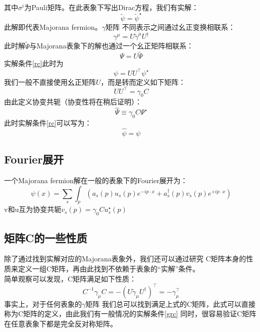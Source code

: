 \documentclass[12pt, a4paper, oneside]{ctexbook}
\def\gm{$ \gamma $矩阵 }
\begin{document}
	其中$ \sigma^i $为Pauli矩阵。在此表象下写出Dirac方程，我们有实解：
	\begin{equation}
		\widetilde{\psi}=\tilde{\psi}^{\star}\label{rc}
	\end{equation} 
	此解即代表Majorana fermion。\gm 不同表示之间通过幺正变换相联系：
	\begin{equation}
		\gamma^\mu=U \tilde{\gamma}^\mu U^{\dagger}
	\end{equation}
	此时解$ \tilde{\Psi} $与Majorana表象下的解也通过一个幺正矩阵相联系：
	\begin{equation}
		\Psi=U \tilde{\Psi}
	\end{equation} 
	实解条件\eqref{rc}此时为
	\begin{equation}
		\psi=U U^{\top} \psi^{\star}
	\end{equation}
	我们一般不直接使用幺正矩阵$ U $，而是转而定义如下矩阵：
	\begin{equation}
		U U^{\top}=\gamma_0 C
	\end{equation} 
	由此定义协变共轭（协变性将在稍后证明）：
	\begin{equation}
		\hat{\Psi} \equiv \gamma_0 C \Psi^{\star}\label{ccg}
	\end{equation}
	此时实解条件\eqref{rc}可以写为：
	\begin{equation}
		\hat{\psi}=\psi\label{grc}
	\end{equation}
	\subsection{Fourier展开}
	一个Majorana fermion解在一般的表象下的Fourier展开为：
	\begin{equation}
		\psi(x)=\sum_s \int_p\left(a_s(p) u_s(p) e^{-i p \cdot x}+a_s^{\dagger}(p) v_s(p) e^{+i p \cdot x}\right)
	\end{equation}
	v和u互为协变共轭$ v_s(p)=\gamma_0 C u_s^{\star}(p) $
	\subsection{矩阵C的一些性质}
	除了通过找到实解对应的Majorana表象外，我们还可以通过研究 C矩阵本身的性质来定义一组C矩阵，再由此找到不依赖于表象的“实解”条件。\\
	简单观察可以发现，C矩阵满足如下性质：
	\begin{equation}
		C^{-1} \gamma_\mu C=-\left(U \tilde{\gamma}_\mu U^{\dagger}\right)^{\top}=-\gamma_\mu^{\top}
	\end{equation} 
	事实上，对于任何表象的\gm 我们总可以找到满足上式的C矩阵，此式可以直接称为C矩阵的定义，由此我们有一般情况的实解条件\eqref{grc}
    同时，很容易验证C矩阵在任意表象下都是完全反对称矩阵。
\end{document}
